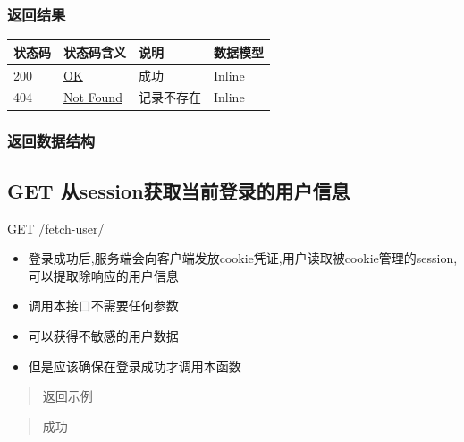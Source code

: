 \documentclass[
]{article}
\begin{document}
\hypertarget{ux8fd4ux56deux7ed3ux679c-19}{%
\subsubsection{返回结果}\label{ux8fd4ux56deux7ed3ux679c-19}}

\begin{longtable}[]{@{}llll@{}}
\toprule
状态码 & 状态码含义 & 说明 & 数据模型 \\
\midrule
\endhead
200 & \href{https://tools.ietf.org/html/rfc7231\#section-6.3.1}{OK} &
成功 & Inline \\
404 & \href{https://tools.ietf.org/html/rfc7231\#section-6.5.4}{Not
Found} & 记录不存在 & Inline \\
\bottomrule
\end{longtable}

\hypertarget{ux8fd4ux56deux6570ux636eux7ed3ux6784-15}{%
\subsubsection{返回数据结构}\label{ux8fd4ux56deux6570ux636eux7ed3ux6784-15}}

\hypertarget{get-ux4ecesessionux83b7ux53d6ux5f53ux524dux767bux5f55ux7684ux7528ux6237ux4fe1ux606f}{%
\subsection{GET
从session获取当前登录的用户信息}\label{get-ux4ecesessionux83b7ux53d6ux5f53ux524dux767bux5f55ux7684ux7528ux6237ux4fe1ux606f}}

GET /fetch-user/

\begin{itemize}
\item
  登录成功后,服务端会向客户端发放cookie凭证,用户读取被cookie管理的session,可以提取除响应的用户信息
\item
  调用本接口不需要任何参数
\item
  可以获得不敏感的用户数据
\item
  但是应该确保在登录成功才调用本函数
\end{itemize}

\begin{quote}
返回示例
\end{quote}

\begin{quote}
成功
\end{quote}
\end{document}
